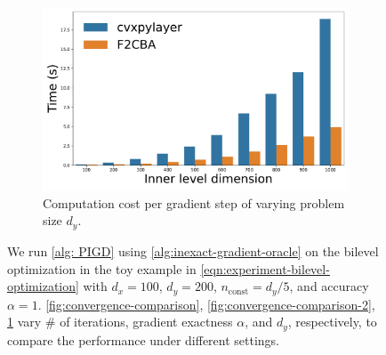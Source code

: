 \begin{figure}
\begin{subfigure}[b]{0.32\textwidth}
        \centering
        \includegraphics[width=\textwidth]{src/figures/time_results.pdf}
        \caption{Computation cost per gradient step of varying problem size $d_y$.}
        \label{fig:computation-comparison}
    \end{subfigure}
    \caption{We run \cref{alg: PIGD} using \cref{alg:inexact-gradient-oracle} on the bilevel optimization in the toy example in \cref{eqn:experiment-bilevel-optimization} with $d_x = 100$, $d_y = 200$, $n_{\text{const}} = d_y / 5$, and accuracy $\alpha = 1$. \cref{fig:convergence-comparison}, \cref{fig:convergence-comparison-2}, \cref{fig:computation-comparison} vary \# of iterations, gradient exactness $\alpha$, and $d_y$, respectively, to compare the performance under different settings.}
    \label{fig:three graphs}
\end{figure}

